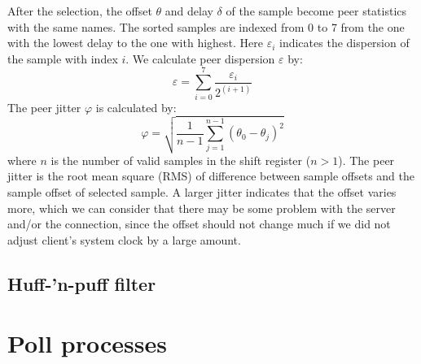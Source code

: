 After the selection, the offset $\theta$ and delay $\delta$ of the sample
become peer statistics with the same names. The sorted samples are indexed from
0 to 7 from the one with the lowest delay to the one with highest. Here
$\varepsilon_i$ indicates the dispersion of the sample with index $i$. We
calculate peer dispersion $\varepsilon$ by:
\begin{equation}
    \varepsilon = \sum^{7}_{i=0} \frac{\varepsilon_i}{2^{(i+1)}}
    \label{eq:peer_dispersion}
\end{equation}
The peer jitter $\varphi$ is calculated by:
\begin{equation}
    \varphi = \sqrt{\frac{1}{n-1} \sum^{n-1}_{j=1} (\theta_0 - \theta_j)^2}
    \label{eq:peer_jitter}
\end{equation}
where $n$ is the number of valid samples in the shift register ($n > 1$).
The peer jitter is the root mean square (RMS) of difference between sample
offsets and the sample offset of selected sample. A larger jitter indicates
that the offset varies more, which we can consider that there may be some
problem with the server and/or the connection, since the offset should not
change much if we did not adjust client's system clock by a large amount.

\subsection{Huff-'n-puff filter}%
\label{sub:huff_n_puff_filter}


\section{Poll processes}%
\label{sec:poll_processes}


